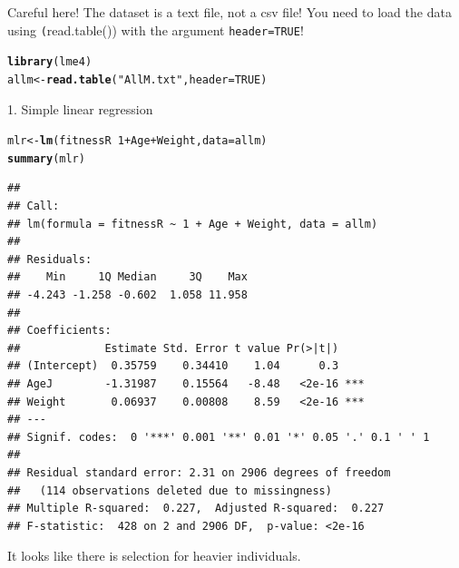 \documentclass[12pt,a4paper]{scrartcl}\usepackage[]{graphicx}\usepackage[]{color}
\makeatletter
\newcommand{\hlnum}[1]{\textcolor[rgb]{0.686,0.059,0.569}{#1}}%
\newcommand{\hlstr}[1]{\textcolor[rgb]{0.192,0.494,0.8}{#1}}%
\newcommand{\hlopt}[1]{\textcolor[rgb]{0,0,0}{#1}}%
\newcommand{\hlstd}[1]{\textcolor[rgb]{0.345,0.345,0.345}{#1}}%
\newcommand{\hlkwb}[1]{\textcolor[rgb]{0.69,0.353,0.396}{#1}}%
\newcommand{\hlkwc}[1]{\textcolor[rgb]{0.333,0.667,0.333}{#1}}%
\newcommand{\hlkwd}[1]{\textcolor[rgb]{0.737,0.353,0.396}{\textbf{#1}}}%
\newenvironment{kframe}{%
 \def\at@end@of@kframe{}%
 \ifinner\ifhmode%
  \def\at@end@of@kframe{\end{minipage}}%
  \begin{minipage}{\columnwidth}%
 \fi\fi%
 \def\FrameCommand##1{\hskip\@totalleftmargin \hskip-\fboxsep
 \colorbox{shadecolor}{##1}\hskip-\fboxsep
     \hskip-\linewidth \hskip-\@totalleftmargin \hskip\columnwidth}%
 \MakeFramed {\advance\hsize-\width
   \@totalleftmargin\z@ \linewidth\hsize
   \@setminipage}}%
 {\par\unskip\endMakeFramed%
 \at@end@of@kframe}
\newenvironment{knitrout}{}{} %
\makeatother
\begin{document}
\begin{Answer}
Careful here! The dataset is a text file, not a csv file! You need to load the data using \texttt(read.table()) with the argument \texttt{header=TRUE}!
\begin{knitrout}
\color{fgcolor}\begin{kframe}
\begin{alltt}
\hlkwd{library}\hlstd{(lme4)}
\hlstd{allm} \hlkwb{<-} \hlkwd{read.table}\hlstd{(}\hlstr{"AllM.txt"}\hlstd{,} \hlkwc{header} \hlstd{=} \hlnum{TRUE}\hlstd{)}
\end{alltt}
\end{kframe}
\end{knitrout}

1. Simple linear regression
\begin{knitrout}
\color{fgcolor}\begin{kframe}
\begin{alltt}
\hlstd{mlr} \hlkwb{<-} \hlkwd{lm}\hlstd{(fitnessR} \hlopt{~} \hlnum{1} \hlopt{+} \hlstd{Age} \hlopt{+} \hlstd{Weight,} \hlkwc{data} \hlstd{= allm)}
\hlkwd{summary}\hlstd{(mlr)}
\end{alltt}
\begin{verbatim}
## 
## Call:
## lm(formula = fitnessR ~ 1 + Age + Weight, data = allm)
## 
## Residuals:
##    Min     1Q Median     3Q    Max 
## -4.243 -1.258 -0.602  1.058 11.958 
## 
## Coefficients:
##             Estimate Std. Error t value Pr(>|t|)    
## (Intercept)  0.35759    0.34410    1.04      0.3    
## AgeJ        -1.31987    0.15564   -8.48   <2e-16 ***
## Weight       0.06937    0.00808    8.59   <2e-16 ***
## ---
## Signif. codes:  0 '***' 0.001 '**' 0.01 '*' 0.05 '.' 0.1 ' ' 1
## 
## Residual standard error: 2.31 on 2906 degrees of freedom
##   (114 observations deleted due to missingness)
## Multiple R-squared:  0.227,	Adjusted R-squared:  0.227 
## F-statistic:  428 on 2 and 2906 DF,  p-value: <2e-16
\end{verbatim}
\end{kframe}
\end{knitrout}
It looks like there is selection for heavier individuals.\\


\end{Answer}
\end{document}
